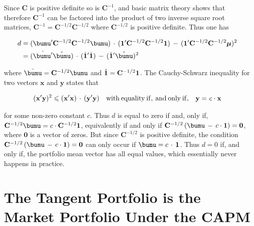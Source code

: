 \documentclass[graybox,envcountchap,sectrefs]{svmono}\usepackage[]{graphicx}\usepackage[]{xcolor}
\begin{document}
\begin{appendices}
Since $\mathbf{C}$ is positive definite so is $\mathbf{C}^{-1}$,
and basic matrix theory shows that therefore $\mathbf{C}^{-1}$ can
be factored into the product of two inverse square root matrices,
$\mathbf{C}^{-1}=\mathbf{C}^{-1/2}\mathbf{C}^{-1/2}$ where $\mathbf{C}^{-1/2}$
is positive definite. Thus one has

\begin{align*}
d & =(\bumu^{\mathrm{\prime}}\mathbf{C}^{-1/2}\mathbf{C}^{-1/2}\bumu)\,\cdot\,({\bf 1^{\mathrm{\prime}}}\mathbf{C}^{-1/2}\mathbf{C}^{-1/2}{\bf 1})\,-\,{\bf ({\bf 1^{\mathrm{\prime}}}}\mathbf{C}^{-1/2}\mathbf{C}^{-1/2}{\bf \boldsymbol{\mu}})^{2}\\
 & =(\check{\bumu^{\prime}}\check{\bumu})\,\cdot\,(\check{\mathbf{1}}^{\mathrm{\prime}}\check{\mathbf{1}})\,-\,(\check{\mathbf{1}}^{\mathrm{\prime}}\check{{\bf \bumu}})^{2}
\end{align*}

where $\check{\bumu}=\mathbf{C}^{-1/2}\bumu$ and $\check{\mathbf{1}}=\mathbf{C}^{-1/2}{\bf 1}$.
The Cauchy-Schwarz inequality for two vectors $\mathbf{x}$ and $\mathbf{y}$
states that

\begin{equation}
{\bf ({\bf x^{\mathrm{\prime}}}}\mathbf{y})^{2}\leqslant{\bf ({\bf x^{\mathrm{\prime}}}}\mathbf{x})\,\cdot\,{\bf ({\bf y^{\mathrm{\prime}}}}\mathbf{y})\quad\mathrm{with\:equality\:if,\:and\:only\:if,}\quad\mathbf{y=\mathrm{\mathit{c\cdot\mathbf{x}}}}
\end{equation}

for some non-zero constant $c$. Thus $d$ is equal to zero if and,
only if, $\mathbf{C}^{-1/2}\bumu=c\cdot\mathbf{C}^{-1/2}{\bf 1}$,
equivalently if and only if $\mathbf{C}^{-1/2}\left(\bumu\,-\,c\cdot\mathbf{1}\right)={\bf 0}$,
where $\mathbf{0}$ is a vector of zeros. But since $\mathbf{C}^{-1/2}$
is positive definite, the condition $\mathbf{C}^{-1/2}\left(\bumu\,-\,c\cdot\mathbf{1}\right)={\bf 0}$
can only occur if $\bumu=c\,\cdot\,\mathbf{1}$. Thus $d=0$ if, and
only if, the portfolio mean vector has all equal values, which essentially
never happens in practice.

\section{The Tangent Portfolio is the Market Portfolio Under the CAPM\label{sec: tangentPortIsMktPortUnderCAPM}}


\end{appendices}
\end{document}
